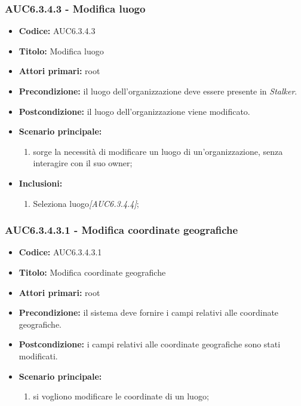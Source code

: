 \documentclass[casi-duso]{subfiles}
\begin{document}
\subsubsection{AUC6.3.4.3 - Modifica luogo}%
\label{subsub:AUC6.3.4.3}
\begin{itemize}
  \item \textbf{Codice:} AUC6.3.4.3
  \item \textbf{Titolo:} Modifica luogo
  \item \textbf{Attori primari:} root
  \item \textbf{Precondizione:} il luogo dell'organizzazione deve essere presente in \emph{Stalker}.
  \item \textbf{Postcondizione:} il luogo dell'organizzazione viene modificato.
  \item \textbf{Scenario principale:}
  \begin{enumerate}
    \item sorge la necessità di modificare un luogo di un'organizzazione, senza interagire con il suo owner;
  \end{enumerate}
  \item \textbf{Inclusioni:}
  \begin{enumerate}
    \item Seleziona luogo\emph{[AUC6.3.4.4]};
  \end{enumerate}
\end{itemize}

\subsubsection{AUC6.3.4.3.1 - Modifica coordinate geografiche}%
\label{subsub:AUC6.3.4.3.1}
\begin{itemize}
  \item \textbf{Codice:} AUC6.3.4.3.1
  \item \textbf{Titolo:} Modifica coordinate geografiche
  \item \textbf{Attori primari:} root
  \item \textbf{Precondizione:} il sistema deve fornire i campi relativi alle coordinate geografiche.
  \item \textbf{Postcondizione:} i campi relativi alle coordinate geografiche sono stati modificati.
  \item \textbf{Scenario principale:}
  \begin{enumerate}
    \item si vogliono modificare le coordinate di un luogo;
  \end{enumerate}
\end{itemize}
\end{document}
